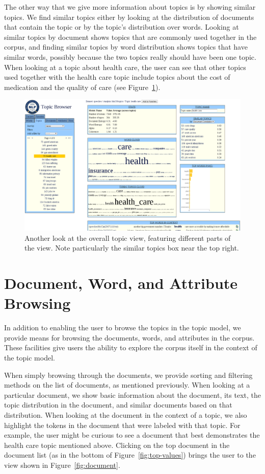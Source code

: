 \documentclass{article}
\begin{document}
The other way that we give more information about topics is by showing similar
topics.  We find similar topics either by looking at the distribution of
documents that contain the topic or by the topic's distribution over words.
Looking at similar topics by document shows topics that are commonly used
together in the corpus, and finding similar topics by word distribution shows
topics that have similar words, possibly because the two topics really should
have been one topic.  When looking at a topic about health care, the user can
see that other topics used together with the health care topic include topics
about the cost of medication and the quality of care (see
Figure~\ref{fig:similar}).

\begin{figure}
  \centering
  \includegraphics[width=\textwidth]{similar_topics}
  \caption{Another look at the overall topic view, featuring different parts of
  the view.  Note particularly the similar topics box near the top right.}
  \label{fig:similar}
\end{figure}

\section{Document, Word, and Attribute Browsing}

In addition to enabling the user to browse the topics in the topic model, we
provide means for browsing the documents, words, and attributes in the corpus.
These facilities give users the ability to explore the corpus itself in the
context of the topic model.

When simply browsing through the documents, we provide sorting and filtering
methods on the list of documents, as mentioned previously.  When looking at a
particular document, we show basic information about the document, its text,
the topic distribution in the document, and similar documents based on that
distribution.  When looking at the document in the context of a topic, we also
highlight the tokens in the document that were labeled with that topic.  For
example, the user might be curious to see a document that best demonstrates the
health care topic mentioned above.  Clicking on the top document in the
document list (as in the bottom of Figure~\ref{fig:top-values}) brings the user
to the view shown in Figure~\ref{fig:document}.
\end{document}
